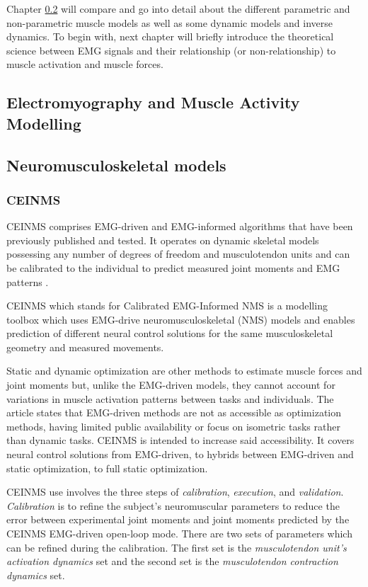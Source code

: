 Chapter \ref{sec:A-NMSModels} will compare and go into detail about the different parametric and non-parametric muscle models as well as some dynamic models and inverse dynamics.
To begin with, next chapter will briefly introduce the theoretical science between EMG signals and their relationship (or non-relationship) to muscle activation and muscle forces.

\subsection{Electromyography and Muscle Activity Modelling}
\label{sec:A-EMG}

\subsection{Neuromusculoskeletal models}
\label{sec:A-NMSModels}

\subsubsection{CEINMS}
CEINMS comprises EMG-driven and EMG-informed algorithms that have been previously published and tested. 
It operates on dynamic skeletal models possessing any number of degrees of freedom and musculotendon units and can be calibrated to the individual to predict measured joint moments and EMG patterns \cite{Pizzolato2015}.

CEINMS which stands for Calibrated EMG-Informed NMS is a modelling toolbox which uses EMG-drive neuromusculoskeletal (NMS) models and enables prediction of different neural control solutions for the same musculoskeletal geometry and measured movements. 

Static and dynamic optimization are other methods to estimate muscle forces and joint moments but, unlike the EMG-driven models, they cannot account for variations in muscle activation patterns between tasks and individuals.
The article states that EMG-driven methods are not as accessible as optimization methods, having limited public availability or focus on isometric tasks rather than dynamic tasks. 
CEINMS is intended to increase said accessibility. 
It covers neural control solutions from EMG-driven, to hybrids between EMG-driven and static optimization, to full static optimization.

CEINMS use involves the three steps of \textit{calibration}, \textit{execution}, and \textit{validation}. \textit{Calibration} is to refine the subject's neuromuscular parameters to reduce the error between experimental joint moments and joint moments predicted by the CEINMS EMG-driven open-loop mode. There are two sets of parameters which can be refined during the calibration. The first set is the \textit{musculotendon unit's activation dynamics} set and the second set is the \textit{musculotendon contraction dynamics} set. 

